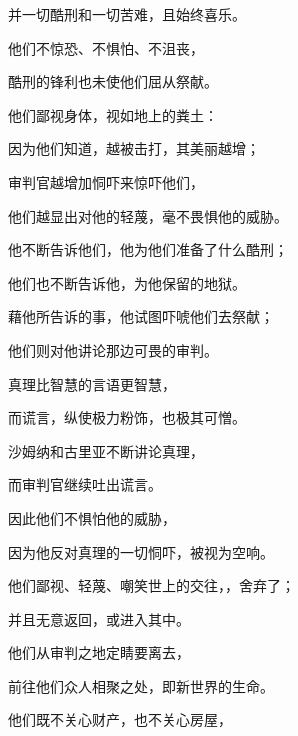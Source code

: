 并一切酷刑和一切苦难，且始终喜乐。\par

他们不惊恐、不惧怕、不沮丧，\par

酷刑的锋利也未使他们屈从祭献。\par

他们鄙视身体，视如地上的粪土：\par

因为他们知道，越被击打，其美丽越增；\par

审判官越增加恫吓来惊吓他们，\par

他们越显出对他的轻蔑，毫不畏惧他的威胁。\par

他不断告诉他们，他为他们准备了什么酷刑；\par

他们也不断告诉他，为他保留的地狱。\par

藉他所告诉的事，他试图吓唬他们去祭献；\par

他们则对他讲论那边可畏的审判。\par

真理比智慧的言语更智慧，\par

而谎言，纵使极力粉饰，也极其可憎。\par

沙姆纳和古里亚不断讲论真理，\par

而审判官继续吐出谎言。\par

因此他们不惧怕他的威胁，\par

因为他反对真理的一切恫吓，被视为空响。\par

他们鄙视、轻蔑、嘲笑世上的交往，，舍弃了；\par

并且无意返回，或进入其中。\par

他们从审判之地定睛要离去，\par

前往他们众人相聚之处，即新世界的生命。\par

他们既不关心财产，也不关心房屋，\par

